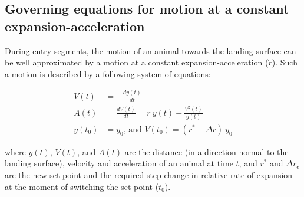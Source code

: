 
\subsection{Governing equations for motion at a constant expansion-acceleration}
\label{sec:s3_text_const_rdot_motion}
During entry segments, the motion of an animal towards the landing surface can be well approximated by a motion at a constant expansion-acceleration ($\dot{r}$). Such a motion is described by a following system of equations:
\begin{ceqn}
	\begin{subequations}
		\label{eq:ch03_const_rdot_motion}
		\begin{align}
			V(t) & = - \frac{dy(t)}{dt} \\
			A(t) & =  \frac{dV(t)}{dt} = \dot{r}~y(t) - \frac{V^2(t)}{y(t)} \\
			y(t_0) & = y_0 \text{, and } V(t_0) = (r^*-\Delta r)~y_0
		\end{align}
	\end{subequations}
\end{ceqn}
where $y(t)$, $V(t)$, and $A(t)$ are the distance (in a direction normal to the landing surface), velocity and acceleration of an animal at time $t$, and $r^*$ and $\Delta r_e$ are the new set-point and the required step-change in relative rate of expansion at the moment of switching the set-point ($t_0$).

